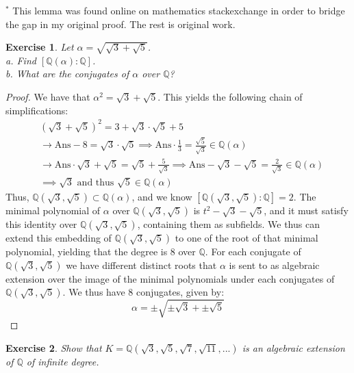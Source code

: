 \documentclass{article}
\newtheorem{exercise}{Exercise}
\begin{document}
\small{$^{*}$ This lemma was found online on mathematics stackexchange in order to bridge the gap in my original proof. The rest is original work.}
\begin{exercise}
  Let $\alpha = \sqrt{\sqrt{3}+\sqrt{5}}$.\\
  a. Find $[\mathbb{Q}(\alpha):\mathbb{Q}]$.\\
  b. What are the conjugates of $\alpha$ over $\mathbb{Q}$?
\end{exercise}

\begin{proof}
  We have that $\alpha^{2} = \sqrt{3}+\sqrt{5}$. This yields the following chain of simplifications:
  \begin{align*}
    &(\sqrt{3}+\sqrt{5})^{2} = 3 + \sqrt{3}\cdot\sqrt{5} + 5 \\
    & \rightarrow \text{Ans} - 8 = \sqrt{3}\cdot\sqrt{5}  \implies  \text{Ans}\cdot \frac{1}{3} = \frac{\sqrt{5}}{\sqrt{3}} \in \mathbb{Q}(\alpha)\\
    & \rightarrow \text{Ans} \cdot \sqrt{3} + \sqrt{5} = \sqrt{5} + \frac{5}{\sqrt{3}} \implies \text{Ans} - \sqrt{3}-\sqrt{5} = \frac{2}{\sqrt{3}} \in \mathbb{Q}(\alpha) \\
    & \implies \sqrt{3}\text{ and thus }\sqrt{5} \in \mathbb{Q}(\alpha)
  \end{align*}
  Thus, $\mathbb{Q}(\sqrt{3}, \sqrt{5}) \subset \mathbb{Q}(\alpha)$, and we know $[\mathbb{Q}(\sqrt{3}, \sqrt{5}):\mathbb{Q}] = 2$. The minimal polynomial of $\alpha$ over $\mathbb{Q}(\sqrt{3}, \sqrt{5})$ is $t^{2} - \sqrt{3} - \sqrt{5}$, and it must satisfy this identity over $\mathbb{Q}(\sqrt{3}, \sqrt{5})$, containing them as subfields. We thus can extend this embedding of $\mathbb{Q}(\sqrt{3}, \sqrt{5})$ to one of the root of that minimal polynomial, yielding that the degree is 8 over $\mathbb{Q}$. For each conjugate of $\mathbb{Q}(\sqrt{3}, \sqrt{5})$ we have different distinct roots that $\alpha$ is sent to as algebraic extension over the image of the minimal polynomials under each conjugates of $\mathbb{Q}(\sqrt{3}, \sqrt{5})$. We thus have 8 conjugates, given by:
  \[
    \alpha = \pm \sqrt{\pm \sqrt{3} + \pm \sqrt{5}}
     \]
\end{proof}

\begin{exercise}
  Show that $K = \mathbb{Q}(\sqrt{3}, \sqrt{5}, \sqrt{7}, \sqrt{11},...)$ is an algebraic extension of $\mathbb{Q}$ of infinite degree.
\end{exercise}
\end{document}
